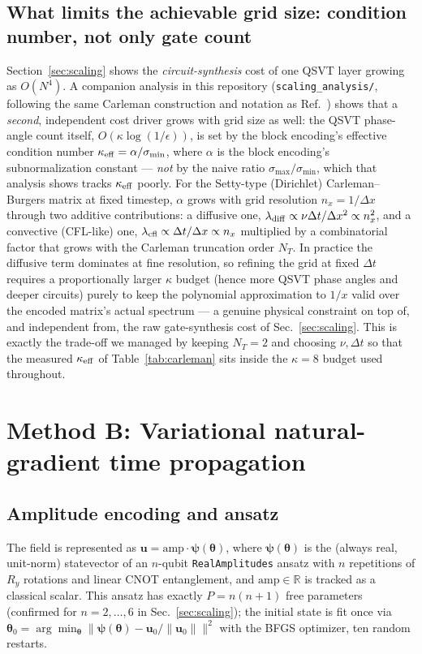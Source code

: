 \documentclass[aps,pra,twocolumn,notitlepage,superscriptaddress,floatfix,10pt]{revtex4-2}
\newcommand{\norm}[1]{\lVert #1 \rVert}
\newcommand{\R}{\mathbb{R}}
\begin{document}
\subsection{What limits the achievable grid size: condition number, not only gate count}
\label{sec:kappa-scaling}
Section~\ref{sec:scaling} shows the \emph{circuit-synthesis} cost of one QSVT layer growing as
$O(N^4)$. A companion analysis in this repository (\texttt{scaling\_analysis/}, following the same
Carleman construction and notation as Ref.~\cite{Setty2026}) shows that a \emph{second}, independent
cost driver grows with grid size as well: the QSVT phase-angle count itself, $O(\kappa\log(1/
\epsilon))$, is set by the block encoding's effective condition number $\kappa_{\rm eff}=\alpha/
\sigma_{\min}$, where $\alpha$ is the block encoding's subnormalization constant --- \emph{not} by
the naive ratio $\sigma_{\max}/\sigma_{\min}$, which that analysis shows tracks $\kappa_{\rm eff}$
poorly. For the Setty-type (Dirichlet) Carleman--Burgers matrix at fixed timestep, $\alpha$ grows with
grid resolution $n_x=1/\Delta x$ through two additive contributions: a diffusive one,
$\lambda_{\rm diff}\propto\nu\Delta t/\Delta x^2\propto n_x^2$, and a convective (CFL-like) one,
$\lambda_{\rm cfl}\propto\Delta t/\Delta x\propto n_x$ multiplied by a combinatorial factor that grows
with the Carleman truncation order $N_T$. In practice the diffusive term dominates at fine
resolution, so refining the grid at fixed $\Delta t$ requires a proportionally larger $\kappa$ budget
(hence more QSVT phase angles and deeper circuits) purely to keep the polynomial approximation to
$1/x$ valid over the encoded matrix's actual spectrum --- a genuine physical constraint on top of, and
independent from, the raw gate-synthesis cost of Sec.~\ref{sec:scaling}. This is exactly the
trade-off we managed by keeping $N_T=2$ and choosing $\nu,\Delta t$ so that the measured
$\kappa_{\rm eff}$ of Table~\ref{tab:carleman} sits inside the $\kappa=8$ budget used throughout.

\section{Method B: Variational natural-gradient time propagation}
\label{sec:variational}

\subsection{Amplitude encoding and ansatz}
The field is represented as $\bm u=\mathrm{amp}\cdot\bm\psi(\bm\theta)$, where $\bm\psi(\bm\theta)$ is
the (always real, unit-norm) statevector of an $n$-qubit \texttt{RealAmplitudes} ansatz with $n$
repetitions of $R_y$ rotations and linear CNOT entanglement, and $\mathrm{amp}\in\R$ is tracked as a
classical scalar. This ansatz has exactly $P=n(n+1)$ free parameters (confirmed for $n=2,\dots,6$ in
Sec.~\ref{sec:scaling}); the initial state is fit once via $\bm\theta_0=\arg\min_{\bm\theta}
\norm{\bm\psi(\bm\theta)-\bm u_0/\norm{\bm u_0}}^2$ with the BFGS optimizer, ten random restarts.
\end{document}
